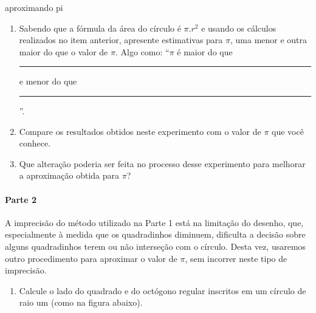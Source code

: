 \begin{task}{aproximando pi}
\begin{enumerate}
\item {} 
Sabendo que a fórmula da área do círculo é \(\pi.r^2\) e usando os cálculos realizados no item anterior, apresente estimativas para \(\pi\), uma menor e outra maior do que o valor de \(\pi\). Algo como: “\(\pi\) é maior do que \rule{3em}{.5pt}  e menor do que \rule{3em}{.5pt}”.

\item {} 
Compare os resultados obtidos neste experimento com o valor de \(\pi\) que você conhece.

\item {} 
Que alteração poderia ser feita no processo desse experimento para melhorar a aproximação obtida para \(\pi\)?

\end{enumerate}

\paragraph{Parte 2}

A imprecisão do método utilizado na Parte 1 está na limitação do desenho, que, especialmente à medida que os quadradinhos diminuem, dificulta a decisão sobre alguns quadradinhos terem ou não interseção com o círculo. Desta vez, usaremos outro procedimento para aproximar o valor de \(\pi\), sem incorrer neste tipo de imprecisão.
\begin{enumerate}
\item {} 
Calcule o lado do quadrado e do octógono regular inscritos em um círculo de raio um (como na figura abaixo).

\begin{figure}[H]
\centering

\begin{tikzpicture} [scale=3.5, every path/.style={very thick}]



\end{tikzpicture}
\end{figure}
\end{enumerate}
\end{task}
